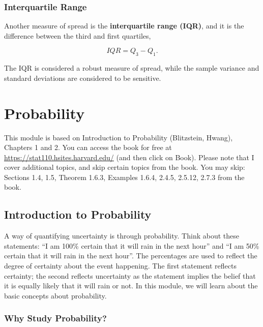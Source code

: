 \documentclass[
]{book}
\begin{document}
\hypertarget{interquartile-range}{%
\subsection{Interquartile Range}\label{interquartile-range}}

Another measure of spread is the \textbf{interquartile range (IQR)}, and it is the difference between the third and first quartiles,

\begin{equation} 
IQR = Q_3 - Q_1.
\label{eq:IQR}
\end{equation}

The IQR is considered a robust measure of spread, while the sample variance and standard deviations are considered to be sensitive.

\hypertarget{probability}{%
\chapter{Probability}\label{probability}}

This module is based on Introduction to Probability (Blitzstein, Hwang), Chapters 1 and 2. You can access the book for free at \url{https://stat110.hsites.harvard.edu/} (and then click on Book). Please note that I cover additional topics, and skip certain topics from the book. You may skip: Sections 1.4, 1.5, Theorem 1.6.3, Examples 1.6.4, 2.4.5, 2.5.12, 2.7.3 from the book.

\hypertarget{introduction-to-probability}{%
\section{Introduction to Probability}\label{introduction-to-probability}}

A way of quantifying uncertainty is through probability. Think about these statements: ``I am 100\% certain that it will rain in the next hour'' and ``I am 50\% certain that it will rain in the next hour''. The percentages are used to reflect the degree of certainty about the event happening. The first statement reflects certainty; the second reflects uncertainty as the statement implies the belief that it is equally likely that it will rain or not. In this module, we will learn about the basic concepts about probability.

\hypertarget{why-study-probability}{%
\subsection{Why Study Probability?}\label{why-study-probability}}
\end{document}
